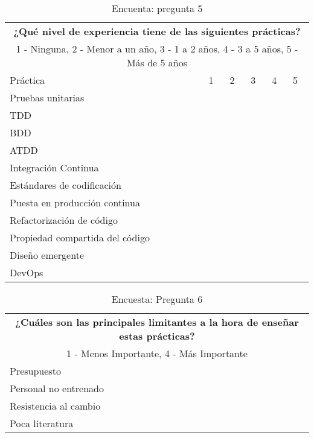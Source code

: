 \begin{table}[h!]
\begin{tabular}{ |p{7.5cm}||p{1cm}|p{1cm}|p{1cm}|p{1cm}|p{1cm}|  }
 \toprule[1.5pt]
 \multicolumn{6}{|c|}{\textbf{¿Qué nivel de experiencia tiene de las siguientes prácticas?}} \\
  \multicolumn{6}{|c|}{1 - Ninguna, 2 - Menor a un año, 3 - 1 a 2 años, 4 - 3 a 5 años, 5 - Más de 5 años} \\
\toprule[1.5pt]
Práctica & 1 & 2 & 3 & 4 & 5 \\
\toprule[1.5pt]
    Pruebas unitarias & & & & &\\
    \hline
    TDD & & & & & \\
    \hline
    BDD & & & & & \\
    \hline
    ATDD & & & & & \\
    \hline
    Integración Continua & & & & & \\
    \hline
    Estándares de codificación & & & & & \\
    \hline
    Puesta en producción continua & & & & & \\
    \hline
    Refactorización de código & & & & & \\
    \hline
    Propiedad compartida del código & & & & & \\
    \hline
    Diseño emergente & & & & & \\
    \hline
    DevOps & & & & & \\
 \hline
\end{tabular}
    \caption{Encuenta: pregunta 5}
\end{table}

\begin{table}[h!]
\begin{tabular}{ |p{12cm}||p{1cm}| }
 \toprule[1.5pt]
 \multicolumn{2}{|c|}{\textbf{¿Cuáles son las principales limitantes a la hora de enseñar estas prácticas?}} \\
  \multicolumn{2}{|c|}{1 - Menos Importante, 4 - Más Importante} \\ 
\toprule[1.5pt]
\toprule[1.5pt]
    Presupuesto & \\
    \hline
    Personal no entrenado & \\
    \hline
    Resistencia al cambio & \\
    \hline
    Poca literatura  & \\
    \hline
\end{tabular}
    \caption{Encuesta: Pregunta 6}
\end{table}

